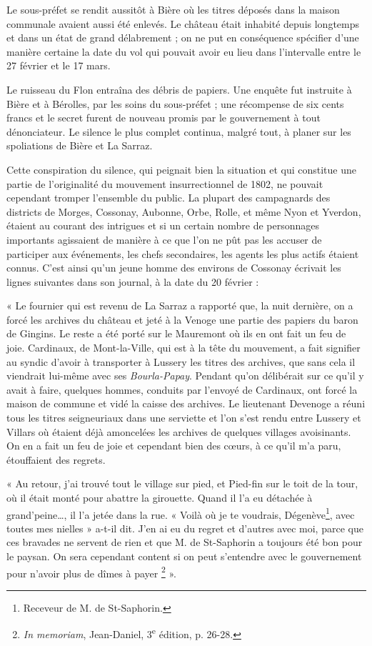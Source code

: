 \documentclass[french,twoside]{book} %
\newenvironment{quoteblock}%
  {\begin{quoting}}
  {\end{quoting}}
\newenvironment{quotebar}{%
    \def\FrameCommand{{\color{rubric!10!}\vrule width 0.5em} \hspace{0.9em}}%
    \def\OuterFrameSep{\itemsep} %
    \MakeFramed {\advance\hsize-\width \FrameRestore}
  }%
  {%
    \endMakeFramed
  }
\renewenvironment{quoteblock}%
  {%
    \savenotes
    \setstretch{0.9}
    \begin{quotebar}
  }
  {%
    \end{quotebar}
    \spewnotes
  }
\begin{document}
\noindent Le sous-préfet se rendit aussitôt à Bière où les titres déposés dans la maison communale avaient aussi été enlevés. Le château était inhabité depuis longtemps et dans un état de grand délabrement ; on ne put en conséquence spécifier d’une manière certaine la date du vol qui pouvait avoir eu lieu dans l’intervalle entre le 27 février et le 17 mars.\par
Le ruisseau du Flon entraîna des débris de papiers. Une enquête fut instruite à Bière et à Bérolles, par les soins du sous-préfet ; une récompense de six cents francs et le secret furent de nouveau promis par le gouvernement à tout dénonciateur. Le silence le plus complet continua, malgré tout, à planer sur les spoliations de Bière et La Sarraz.\par
Cette conspiration du silence, qui peignait bien la situation et qui constitue une partie de l’originalité du mouvement insurrectionnel de 1802, ne pouvait cependant tromper l’ensemble du public. La plupart des campagnards des districts de Morges, Cossonay, Aubonne, Orbe, Rolle, et même Nyon et Yverdon, étaient au courant des intrigues et si un certain nombre de personnages importants agissaient de manière à ce que l’on ne pût pas les accuser de participer aux événements, les chefs secondaires, les agents les plus actifs étaient connus. C’est ainsi qu’un jeune homme des environs de Cossonay écrivait les lignes suivantes dans son journal, à la date du 20 février :\par

\begin{quoteblock}
 \noindent « Le fournier qui est revenu de La Sarraz a rapporté que, la nuit dernière, on a forcé les archives du château et jeté à la Venoge une partie des papiers du baron de Gingins. Le reste a été porté sur le Mauremont où ils en ont fait un feu de joie. Cardinaux, de Mont-la-Ville, qui est à la tête du mouvement, a fait signifier au syndic d’avoir à transporter à Lussery les titres des archives, que sans cela il viendrait lui-même avec ses \emph{Bourla-Papay}. Pendant qu’on délibérait sur ce qu’il y avait à faire, quelques hommes, conduits par l’envoyé de Cardinaux, ont forcé la maison de commune et vidé la caisse des archives. Le lieutenant Devenoge a réuni tous les titres seigneuriaux dans une serviette et l’on s’est rendu entre Lussery et Villars où étaient déjà amoncelées les archives de quelques villages avoisinants. On en a fait un feu de joie et cependant bien des cœurs, à ce qu’il m’a paru, étouffaient des regrets.\par
 « Au retour, j’ai trouvé tout le village sur pied, et Pied-fin sur le toit de la tour, où il était monté pour abattre la girouette. Quand il l’a eu détachée à grand’peine…, il l’a jetée dans la rue. « Voilà où je te voudrais, Dégenève\footnote{Receveur de M. de St-Saphorin.}, avec toutes mes nielles » a-t-il dit. J’en ai eu du regret et d’autres avec moi, parce que ces bravades ne servent de rien et que M. de St-Saphorin a toujours été bon pour le paysan. On sera cependant content si on peut s’entendre avec le gouvernement pour n’avoir plus de dîmes à payer \footnote{\emph{In memoriam}, Jean-Daniel, 3\textsuperscript{e} édition, p. 26-28.} ».
 \end{quoteblock}
\end{document}
